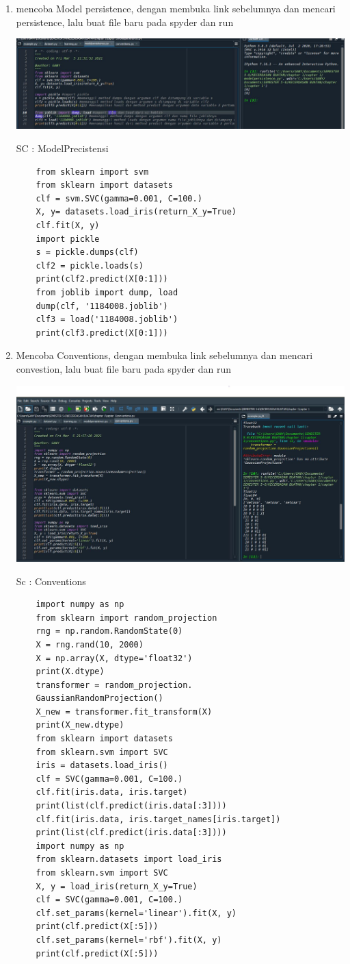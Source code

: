\begin{enumerate}
    \item mencoba Model persistence, dengan membuka link sebelumnya dan mencari persistence, lalu buat file baru pada spyder dan run
    \begin{center}
    \includegraphics[width=.8\textwidth]{figures/1184008/chapter1/mo.JPG}
    \end{center} 
    SC : ModelPrecistensi
    \begin{verbatim}
    from sklearn import svm
    from sklearn import datasets
    clf = svm.SVC(gamma=0.001, C=100.)
    X, y= datasets.load_iris(return_X_y=True)
    clf.fit(X, y)
    import pickle
    s = pickle.dumps(clf) 
    clf2 = pickle.loads(s)
    print(clf2.predict(X[0:1])) 
    from joblib import dump, load 
    dump(clf, '1184008.joblib')
    clf3 = load('1184008.joblib') 
    print(clf3.predict(X[0:1]))    
    \end{verbatim}
    \item Mencoba Conventions, dengan membuka link sebelumnya dan mencari convestion, lalu buat file baru pada spyder dan run
     \begin{center}
    \includegraphics[width=.8\textwidth]{figures/1184008/chapter1/6.JPG}
    \end{center}
    Sc : Conventions
    \begin{verbatim}
    import numpy as np
    from sklearn import random_projection
    rng = np.random.RandomState(0)
    X = rng.rand(10, 2000)
    X = np.array(X, dtype='float32')
    print(X.dtype)
    transformer = random_projection.
    GaussianRandomProjection()
    X_new = transformer.fit_transform(X)
    print(X_new.dtype)
    from sklearn import datasets
    from sklearn.svm import SVC
    iris = datasets.load_iris()
    clf = SVC(gamma=0.001, C=100.)
    clf.fit(iris.data, iris.target)
    print(list(clf.predict(iris.data[:3])))
    clf.fit(iris.data, iris.target_names[iris.target])
    print(list(clf.predict(iris.data[:3])))
    import numpy as np
    from sklearn.datasets import load_iris
    from sklearn.svm import SVC
    X, y = load_iris(return_X_y=True)
    clf = SVC(gamma=0.001, C=100.)
    clf.set_params(kernel='linear').fit(X, y)
    print(clf.predict(X[:5]))
    clf.set_params(kernel='rbf').fit(X, y)
    print(clf.predict(X[:5]))    
    \end{verbatim}
\end{enumerate}


